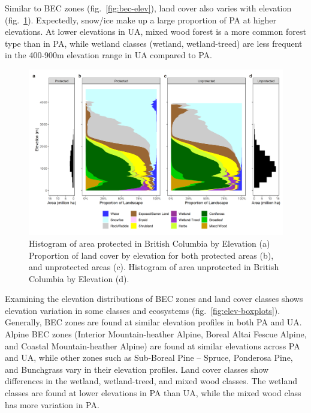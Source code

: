 \documentclass[11pt]{article}
\makeatletter
\def\maxwidth{\ifdim\Gin@nat@width>\linewidth\linewidth
\else\Gin@nat@width\fi}
\let\Oldincludegraphics\includegraphics
\renewcommand{\includegraphics}[1]{\Oldincludegraphics[width=\maxwidth]{#1}}
\makeatother
\begin{document}
Similar to BEC zones (fig.~\ref{fig:bec-elev}), land cover also varies
with elevation (fig.~\ref{fig:lcc-elev}). Expectedly, snow/ice make up a
large proportion of PA at higher elevations. At lower elevations in UA,
mixed wood forest is a more common forest type than in PA, while wetland
classes (wetland, wetland-treed) are less frequent in the 400-900m
elevation range in UA compared to PA.

\begin{figure}
\hypertarget{fig:lcc-elev}{%
\centering
\includegraphics{figures/lcc_elev_hist.png}
\caption{Histogram of area protected in British Columbia by Elevation
(a) Proportion of land cover by elevation for both protected areas (b),
and unprotected areas (c). Histogram of area unprotected in British
Columbia by Elevation (d).}\label{fig:lcc-elev}
}
\end{figure}

Examining the elevation distributions of BEC zones and land cover
classes shows elevation variation in some classes and ecosystems
(fig.~\ref{fig:elev-boxplots}). Generally, BEC zones are found at
similar elevation profiles in both PA and UA. Alpine BEC zones (Interior
Mountain-heather Alpine, Boreal Altai Fescue Alpine, and Coastal
Mountain-heather Alpine) are found at similar elevations across PA and
UA, while other zones such as Sub-Boreal Pine -- Spruce, Ponderosa Pine,
and Bunchgrass vary in their elevation profiles. Land cover classes show
differences in the wetland, wetland-treed, and mixed wood classes. The
wetland classes are found at lower elevations in PA than UA, while the
mixed wood class has more variation in PA.
\end{document}
